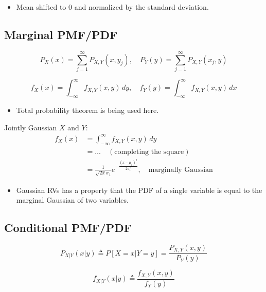 \begin{notes}
    \begin{itemize}
        \item Mean shifted to 0 and normalized by the standard deviation.
    \end{itemize}
\end{notes}

\subsection{Marginal PMF/PDF}
\begin{definition}
    \begin{equation}
    P_X(x) = \sum_{j=1}^{\infty} P_{X,Y}(x, y_j), \quad P_Y(y) = \sum_{j=1}^{\infty} P_{X,Y}(x_j, y)
    \end{equation}
    
    \begin{equation}
    f_X(x) = \int_{-\infty}^{\infty} f_{X,Y}(x, y) \, dy, \quad f_Y(y) = \int_{-\infty}^{\infty} f_{X,Y}(x, y) \, dx
    \end{equation}
\end{definition}

\begin{notes}
    \begin{itemize}
        \item Total probability theorem is being used here.
    \end{itemize}
\end{notes}

\begin{example} Jointly Gaussian $X$ and $Y$:
    \begin{align*}
        f_X(x) &= \int_{-\infty}^{\infty} f_{X,Y}(x, y) \, dy \\
               &= \dots \quad (\text{completing the square}) \\
               &= \frac{1}{\sqrt{2\pi} \sigma_1} e^{-\frac{(x-\mu_1)^2}{2\sigma_1^2}}, \quad \text{marginally Gaussian}
    \end{align*}
    \begin{itemize}
        \item Gaussian RVs has a property that the PDF of a single variable is equal to the marginal Gaussian of two variables.
    \end{itemize}
\end{example}

\subsection{Conditional PMF/PDF}
\begin{definition}
    \begin{equation}
    P_{X|Y}(x|y) \triangleq P[X = x | Y = y] = \frac{P_{X,Y}(x, y)}{P_Y(y)}
    \end{equation}
    
    \begin{equation}
    f_{X|Y}(x|y) \triangleq \frac{f_{X,Y}(x, y)}{f_Y(y)}
    \end{equation}
\end{definition}


